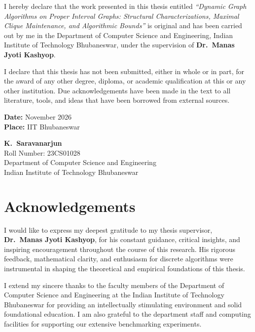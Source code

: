 I hereby declare that the work presented in this thesis entitled
\textit{``Dynamic Graph Algorithms on Proper Interval Graphs: Structural Characterizations, Maximal Clique Maintenance, and Algorithmic Bounds''}
is original and has been carried out by me in the Department of Computer Science and Engineering,
Indian Institute of Technology Bhubaneswar, under the supervision of \textbf{Dr.\ Manas Jyoti Kashyop}.

I declare that this thesis has not been submitted, either in whole or in part, for the award of any other degree, diploma, or academic qualification at this or any other institution. Due acknowledgements have been made in the text to all literature, tools, and ideas that have been borrowed from external sources.

\vspace{2.5cm}

\noindent
\begin{minipage}[t]{0.5\textwidth}
    \textbf{Date:} November 2026\\
    \textbf{Place:} IIT Bhubaneswar
\end{minipage}
\hfill
\begin{minipage}[t]{0.45\textwidth}
    \raggedleft
    \textbf{K.\ Saravanarjun}\\
    Roll Number: 23CS01028\\
    Department of Computer Science and Engineering\\
    Indian Institute of Technology Bhubaneswar
\end{minipage}

\clearpage


\chapter*{Acknowledgements}

I would like to express my deepest gratitude to my thesis supervisor, \textbf{Dr.\ Manas Jyoti Kashyop}, for his constant guidance, critical insights, and inspiring encouragement throughout the course of this research. His rigorous feedback, mathematical clarity, and enthusiasm for discrete algorithms were instrumental in shaping the theoretical and empirical foundations of this thesis.

I extend my sincere thanks to the faculty members of the Department of Computer Science and Engineering at the Indian Institute of Technology Bhubaneswar for providing an intellectually stimulating environment and solid foundational education. I am also grateful to the department staff and computing facilities for supporting our extensive benchmarking experiments.

